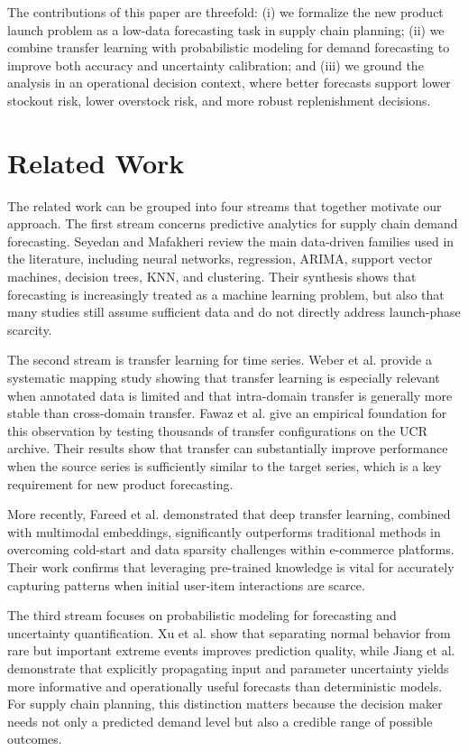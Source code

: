 \documentclass[3p,times,procedia]{elsarticle}
\begin{document}
The contributions of this paper are threefold: (i) we formalize the new product launch problem as a low-data forecasting task in supply chain planning; (ii) we combine transfer learning \cite{Weber2021,Fawaz2018} with probabilistic modeling for demand forecasting \cite{Xu2019,Jiang2019} to improve both accuracy and uncertainty calibration; and (iii) we ground the analysis in an operational decision context, where better forecasts support lower stockout risk, lower overstock risk, and more robust replenishment decisions.
\section{Related Work}
\label{related}

The related work can be grouped into four streams that together motivate our approach. The first stream concerns predictive analytics for supply chain demand forecasting. Seyedan and Mafakheri \cite{Seyedan2020} review the main data-driven families used in the literature, including neural networks, regression, ARIMA, support vector machines, decision trees, KNN, and clustering. Their synthesis shows that forecasting is increasingly treated as a machine learning problem, but also that many studies still assume sufficient data and do not directly address launch-phase scarcity.

The second stream is transfer learning for time series. Weber et al. \cite{Weber2021} provide a systematic mapping study showing that transfer learning is especially relevant when annotated data is limited and that intra-domain transfer is generally more stable than cross-domain transfer. Fawaz et al. \cite{Fawaz2018} give an empirical foundation for this observation by testing thousands of transfer configurations on the UCR archive. Their results show that transfer can substantially improve performance when the source series is sufficiently similar to the target series, which is a key requirement for new product forecasting.

More recently, Fareed et al. \cite{Fareed2025} demonstrated that deep transfer learning, combined with multimodal embeddings, significantly outperforms traditional methods in overcoming cold-start and data sparsity challenges within e-commerce platforms. Their work confirms that leveraging pre-trained knowledge is vital for accurately capturing patterns when initial user-item interactions are scarce.

The third stream focuses on probabilistic modeling for forecasting and uncertainty quantification. Xu et al. \cite{Xu2019} show that separating normal behavior from rare but important extreme events improves prediction quality, while Jiang et al. \cite{Jiang2019} demonstrate that explicitly propagating input and parameter uncertainty yields more informative and operationally useful forecasts than deterministic models. For supply chain planning, this distinction matters because the decision maker needs not only a predicted demand level but also a credible range of possible outcomes.
\end{document}
